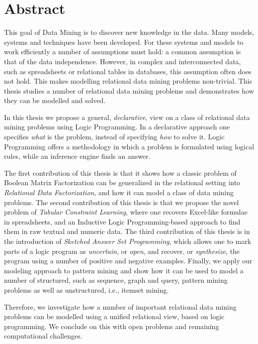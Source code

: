 \chapter{Abstract} \label{ch:abstract}
This goal of Data Mining is to discover new knowledge in the data. Many models, systems and techniques have been developed. For these systems and models to work efficiently a number of assumptions must hold: a common assumption is that of the data independence. However, in complex and interconnected data, such as spreadsheets or relational tables in databases, this assumption often does not hold. This makes modelling relational data mining problems non-trivial. This thesis studies a number of relational data mining problems and demonstrates how they can be modelled and solved.

In this thesis we propose a general, \textit{declarative}, view on a
class of relational data mining problems using Logic Programming. In a
declarative approach one specifies \textit{what} is the problem,
instead of specifying \textit{how} to solve it. Logic Programming
offers a methodology in which a problem is formulated using logical
rules, while an inference engine finds an answer. 

The first contribution of this thesis is that it shows how a classic
problem of Boolean Matrix Factorization can be generalized in the
relational setting into \textit{Relational Data Factorization}, and
how it can model a class of data mining problems. The second contribution of this thesis is that we propose the novel problem of \textit{Tabular Constraint Learning}, where one recovers Excel-like formulae in spreadsheets, and an Inductive Logic Programming-based approach to find them in raw textual and numeric data. The third contribution of this thesis is in the introduction of \textit{Sketched Answer Set Programming}, which allows one to mark parts of a logic program as \textit{uncertain}, or \textit{open}, and recover, or \textit{synthesize}, the program using a number of positive and negative examples. Finally, we apply our modeling approach to pattern mining and show how it can be used to model a number of structured, such as sequence, graph and query, pattern mining problems as well as unstructured, i.e., itemset mining. 

Therefore, we investigate how a number of important relational data mining problems can be modelled using a unified relational view, based on logic programming. We conclude on this with open problems and remaining computational challenges.

\cleardoublepage

